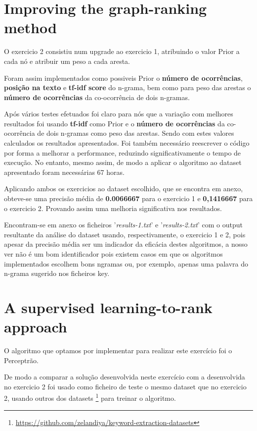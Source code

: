 \documentclass[a4paper,titlepage,11pt]{article}
\begin{document}
\section{Improving the graph-ranking method}
O exercicio 2 consistiu num upgrade ao exercicio 1, atribuindo o valor Prior a cada nó e atribuir um peso a
cada aresta.

Foram assim implementados como possiveis Prior o \textbf{número de ocorrências}, \textbf{posição na texto} e
\textbf{tf-idf score} do n-grama, bem como para peso das arestas o \textbf{número de ocorrências} da co-ocorrência
de dois n-gramas.

Após vários testes efetuados foi claro para nós que a variação com melhores resultados foi usando \textbf{tf-idf} como Prior
e o \textbf{número de ocorrências} da co-ocorrência de dois n-gramas como peso das arestas. Sendo com estes valores calculados
os resultados apresentados. Foi também necessário reescrever o código por forma a melhorar a performance, reduzindo significativamente
o tempo de execução. No entanto, mesmo assim, de modo a aplicar o algoritmo ao dataset apresentado foram necessárias 67 horas.

Aplicando ambos os exercicios ao dataset escolhido, que se encontra em anexo, obteve-se uma precisão média de \textbf{0.0066667} para o
exercicio 1 e \textbf{0,1416667} para o exercicio 2. Provando assim uma melhoria significativa nos resultados.

Encontram-se em anexo os ficheiros '\textit{results-1.txt}' e '\textit{results-2.txt}' com o output resultante da análise do dataset
usando, respectivamente, o exercicio 1 e 2, pois apesar da precisão média ser um indicador da eficácia destes algoritmos, a nosso ver
não é um bom identificador pois existem casos em que os algoritmos implementados escolhem bons ngramas ou, por exemplo, apenas uma
palavra do n-grama sugerido nos ficheiros key.

\newpage

\section{A supervised learning-to-rank approach}
O algoritmo que optamos por implementar para realizar este exercício foi o Perceptrão.

De modo a comparar a solução desenvolvida neste exercício com a desenvolvida no exercicio 2
foi usado como  ficheiro de teste o mesmo dataset que no exercicio 2, usando outros dos datasets
\footnote{ \href{https://github.com/zelandiya/keyword-extraction-datasets}{https://github.com/zelandiya/keyword-extraction-datasets} }
para treinar o algoritmo.
\end{document}
